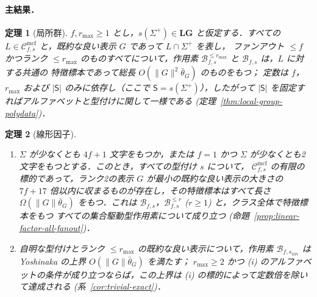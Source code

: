 \documentclass[11pt,a4paper]{ltjsarticle}
\numberwithin{equation}{section}
\theoremstyle{plain}
\theoremstyle{definition}
\theoremstyle{remark}
\newcommand{\Cmcf}[2]{\mathcal{C}^{\mathrm{mcf}}_{#1,#2}}
\theoremstyle{plain}
\newtheorem{mainthm}{定理}
\begin{document}
\paragraph{主結果．}

\begin{mainthm}[局所群]
\label{thm:A}
$f,r_{\max}\ge1$ とし，$s(\Sigma^+)\in\mathbf{LG}$ と仮定する．すべての
$L\in\Cmcf{f}{s}$ と，既約な良い表示 $G$ であって $L\cap\Sigma^+$ を表し，
ファンアウト $\le f$ かつランク $\le r_{\max}$ のものすべてについて，作用素
$\mathcal B^{\le r_{\max}}_{f,s}$ と $\mathcal B_{f,s}$ は，$L$ に対する共通の
特徴標本であって総長 $O(\|G\|^2\bar\theta_G)$ のものをもつ；
定数は $f$，$r_{\max}$ および $|\mathsf S|$ のみに依存し（ここで
$\mathsf S=s(\Sigma^+)$），したがって $|\mathsf S|$ を固定すればアルファベットと型付けに関して一様である
\textup(定理~\ref{thm:local-group-polydata}\textup)．
\end{mainthm}

\begin{mainthm}[線形因子]
\label{thm:B}
\begin{enumerate}[label=\textup{(\roman*)},leftmargin=*]
\item $\Sigma$ が少なくとも $4f+1$ 文字をもつか，または $f=1$ かつ
$\Sigma$ が少なくとも2文字をもつとする．このとき，すべての型付け $s$ について，
$\Cmcf{f}{s}$ の有限の標的であって，ランク2の表示 $G$ が最小の既約な良い表示の大きさの
$7f+17$ 倍以内に収まるものが存在し，その特徴標本はすべて長さ $\Omega(\|G\|\bar\theta_G)$ をもつ．これは
$\mathcal B_{f,s}$，$\mathcal B^{\le r}_{f,s}$ \textup($r\ge1$\textup) と，クラス全体で特徴標本をもつ
すべての集合駆動型作用素について成り立つ
\textup(命題~\ref{prop:linear-factor-all-fanout}\textup)．
\item 自明な型付けとランク
$\le r_{\max}$ の既約な良い表示について，作用素 $\mathcal B_{f,s_{\mathrm{triv}}}$ は
Yoshinaka の上界 $O(\|G\|\bar\theta_G)$ \cite{Yoshinaka2011} を満たす；
$r_{\max}\ge2$ かつ \textup{(i)} のアルファベットの条件が成り立つならば，この上界は
\textup{(i)} の標的によって定数倍を除いて達成される
\textup(系~\ref{cor:trivial-exact}\textup)．
\end{enumerate}
\end{mainthm}
\end{document}
